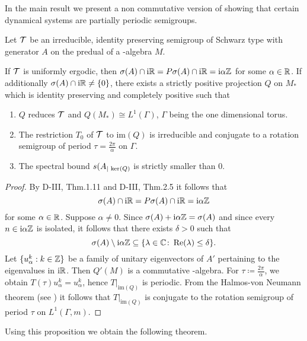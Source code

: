 In the main result we present a non commutative version of \citet{nagel:1984} showing that certain dynamical systems are partially periodic semigroups.
\begin{proposition}\label{prop:d4-3.10}
Let $ \mathcal{T} $  be an irreducible, identity preserving semigroup of Schwarz type with generator $ A $  on the predual of a \WA-algebra $ M $.

If $ \mathcal{T} $  is uniformly ergodic, then $ \sigma(A) \cap \mathrm{i}\mathbb{R} = P\sigma(A) \cap \mathrm{i}\mathbb{R} = \mathrm{i}\alpha\mathbb{Z} $  for some $ \alpha \in \mathbb{R} $.
If additionally $ \sigma(A) \cap \mathrm{i}\mathbb{R} \neq \{0\} $, there exists a strictly positive projection $ Q $  on $ M_{*} $  which is identity preserving and completely positive such that
\begin{enumerate}[\upshape (i)]
\item
$ Q $  reduces $ \mathcal{T} $  and $ Q(M_{*}) \cong L^{1}(\Gamma) $, $ \Gamma $  being the one dimensional torus.

\item
The restriction $ T_{0} $  of $ \mathcal{T} $  to $ \text{im}(Q) $  is irreducible and conjugate to a rotation semigroup of period $ \tau = \frac{2\pi}{\alpha} $  on $ \Gamma $.

\item
The spectral bound $ s(A_{| \mathop{}\mathrm{ker}(Q) } $  is strictly smaller than $ 0 $.
\end{enumerate}
\end{proposition}
\begin{proof}
By D-III, Thm.1.11 and D-III, Thm.2.5 it follows that
\[
\sigma(A) \cap \mathrm{i}\mathbb{R} = P\sigma(A) \cap \mathrm{i}\mathbb{R} = \mathrm{i}\alpha\mathbb{Z}
\]
for some $ \alpha \in \mathbb{R} $.
Suppose $ \alpha \neq 0 $.
Since $ \sigma(A) + \mathrm{i}\alpha\mathbb{Z} = \sigma(A) $  and since every $ n \in \mathrm{i}\alpha\mathbb{Z} $  is isolated, it follows that there exists $ \delta > 0 $  such that
\[
\sigma(A) \setminus \mathrm{i}\alpha\mathbb{Z} \subseteq \{\lambda \in \mathbb{C} \colon  \mathop{}\!\mathrm{Re}(\lambda) \leq \delta\}.
\]
Let $ \{u_{\alpha}^{k}: k \in \mathbb{Z}\} $  be a family of unitary eigenvectors of $ A' $  pertaining to the eigenvalues in $ \mathrm{i}\mathbb{R} $.
Then $ Q'(M) $  is a commutative \WA-algebra.
For $ \tau \coloneqq \frac{2\pi}{\alpha} $, we obtain $ T(\tau)u_{\alpha}^{k} = u_{\alpha}^{k} $, hence $ T|_{\text{im}(Q)} $  is periodic.
From the Halmos-von Neumann theorem (see \citet[Thm. III.7.11]{schaefer:1974})
it follows that $ T|_{\text{im}(Q)} $  is conjugate to the rotation semigroup of period $ \tau $  on $ L^{1}(\Gamma,m) $.
\end{proof}
Using this proposition we obtain the following theorem.
